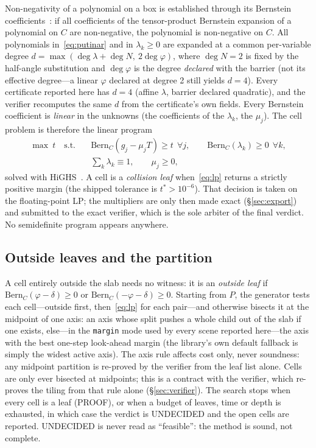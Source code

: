 \documentclass[10pt,twocolumn,letterpaper]{article}
\newcommand{\Bern}{\mathrm{Bern}}
\newcommand{\vphi}{\varphi}
\begin{document}
Non-negativity of a polynomial on a box is established through its Bernstein coefficients~\cite{garloff1985}: if all coefficients of the tensor-product Bernstein expansion of a polynomial on $C$ are non-negative, the polynomial is non-negative on $C$. All polynomials in~\eqref{eq:putinar} and in $\lambda_k\ge0$ are expanded at a common per-variable degree $d=\max(\deg\lambda+\deg N,\ 2\deg\vphi)$, where $\deg N=2$ is fixed by the half-angle substitution and $\deg\vphi$ is the degree \emph{declared} with the barrier (not its effective degree---a linear $\vphi$ declared at degree 2 still yields $d=4$). Every certificate reported here has $d=4$ (affine $\lambda$, barrier declared quadratic), and the verifier recomputes the same $d$ from the certificate's own fields. Every Bernstein coefficient is \emph{linear} in the unknowns (the coefficients of the $\lambda_k$, the $\mu_j$). The cell problem is therefore the linear program
\begin{equation}\label{eq:lp}
\begin{aligned}
\max\ t\quad\text{s.t.}\quad &\Bern_C(g_j-\mu_jT)\ge t\ \ \forall j,\qquad \Bern_C(\lambda_k)\ge0\ \ \forall k,\\
&\textstyle\sum_k\lambda_k\equiv1,\qquad \mu_j\ge0,
\end{aligned}
\end{equation}
solved with HiGHS~\cite{huangfu2018}. A cell is a \emph{collision leaf} when~\eqref{eq:lp} returns a strictly positive margin (the shipped tolerance is $t^*>10^{-6}$). That decision is taken on the floating-point LP; the multipliers are only then made exact (\S\ref{sec:export}) and submitted to the exact verifier, which is the sole arbiter of the final verdict. No semidefinite program appears anywhere.

\subsection{Outside leaves and the partition}\label{sec:partition}
A cell entirely outside the slab needs no witness: it is an \emph{outside leaf} if $\Bern_C(\vphi-\delta)\ge0$ or $\Bern_C(-\vphi-\delta)\ge0$. Starting from $P$, the generator tests each cell---outside first, then~\eqref{eq:lp} for each pair---and otherwise bisects it at the midpoint of one axis: an axis whose split pushes a whole child out of the slab if one exists, else---in the \texttt{margin} mode used by every scene reported here---the axis with the best one-step look-ahead margin (the library's own default fallback is simply the widest active axis). The axis rule affects cost only, never soundness: any midpoint partition is re-proved by the verifier from the leaf list alone. Cells are only ever bisected at midpoints; this is a contract with the verifier, which re-proves the tiling from that rule alone (\S\ref{sec:verifier}). The search stops when every cell is a leaf (PROOF), or when a budget of leaves, time or depth is exhausted, in which case the verdict is UNDECIDED and the open cells are reported. UNDECIDED is never read as ``feasible'': the method is sound, not complete.
\end{document}
